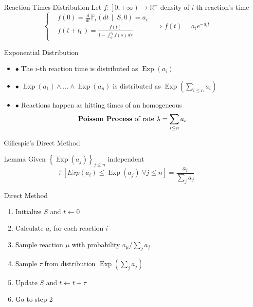 \documentclass{beamer}
\DeclareMathOperator{\Exp}{\text{Exp}}
\begin{document}
\begin{frame}{Reaction Times Distribution}
  Let $f:\left[0, +\infty\right) \longrightarrow \mathbb{R}^+$ density of $i$-th reaction's time 
  \begin{equation*}
    \left\{
    \begin{aligned}
      &f(0) = \frac{d}{dt} \mathbb{P}_i \left(dt \, \middle| \, S, 0 \right)= a_i\\
      &f(t + t_0) = \frac{f(t)}{1 - \int_0^{t_0} f(s)\, ds}         
    \end{aligned}\right.
    \implies f(t) =  a_i e^{-a_i t}
  \end{equation*}
  \pause
  \begin{block}{Exponential Distribution}
    \begin{itemize}
    \item $\bullet$ The $i$-th reaction time is distributed as $\Exp(a_i)$
\pause
    \item $\bullet$ $\Exp(a_1) \land \dots \land \Exp(a_n)$ is distributed as
      $\Exp\left(\sum_{i\leq n} a_i\right)$ 
\pause
    \item $\bullet$ Reactions happen as hitting times of an homogeneous 
      $$\text{\textbf{Poisson Process} of rate } \lambda =  \sum_{i\leq n} a_i$$ 
    \end{itemize}
  \end{block}
\end{frame}

\begin{frame}{Gillespie's Direct Method}
  \begin{block}{Lemma}
    Given $\left\{\Exp(a_j)\right\}_{j\leq n}$ independent 
    \begin{equation*}
      \mathbb{P}\left[Exp(a_i) \leq \Exp(a_j) \; \forall j \leq n \right] = \frac{a_i}{\sum_ja_j}
    \end{equation*}
  \end{block}
  \pause
  \begin{block}{Direct Method}
    \begin{enumerate}
    \item Initialize $S$ and $t\leftarrow 0$ 
    \item Calculate $a_i$ for each reaction $i$
    \item Sample reaction $\mu$ with probability $a_\mu \big/ \sum_j a_j$
    \item Sample $\tau$ from distribution $\Exp\left(\sum_j a_j\right)$
    \item Update $S$ and $t \leftarrow t + \tau$
    \item Go to step 2
    \end{enumerate}
  \end{block}
\end{frame}
\end{document}
